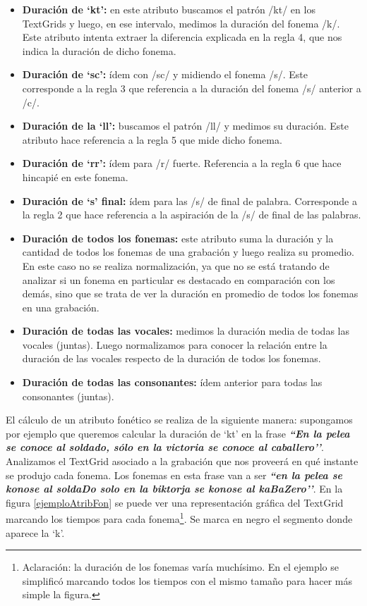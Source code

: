 \begin{itemize}
    \item \textbf{Duración de `kt’:} en este atributo buscamos el patrón /kt/ en los TextGrids y luego, en ese intervalo, medimos la duración del fonema /k/. Este atributo intenta extraer la diferencia explicada en la regla 4, que nos indica la duración de dicho fonema.
    \item \textbf{Duración de `sc’:} ídem con /sc/ y midiendo el fonema /s/. Este corresponde a la regla 3 que referencia a la duración del fonema /s/ anterior a /c/.  
    \item \textbf{Duración de la `ll’:} buscamos el patrón /ll/ y medimos su duración. Este atributo hace referencia a la regla 5 que mide dicho fonema.
    \item \textbf{Duración de `rr’:} ídem para /r/ fuerte. Referencia a la regla 6 que hace hincapié en este fonema.
    \item \textbf{Duración de `s’ final:} ídem para las /s/ de final de palabra. Corresponde a la regla 2 que hace referencia a la aspiración de la /s/ de final de las palabras.  
    \item \textbf{Duración de todos los fonemas:} este atributo suma la duración y la cantidad de todos los fonemas de una grabación y luego realiza su promedio. En este caso no se realiza normalización, ya que no se está tratando de analizar si un fonema en particular es destacado en comparación con los demás, sino que se trata de ver la duración en promedio de todos los fonemas en una grabación.
    \item \textbf{Duración de todas las vocales:} medimos la duración media de todas las vocales (juntas). Luego normalizamos para conocer la relación entre la duración de las vocales respecto de la duración de todos los fonemas.
    \item \textbf{Duración de todas las consonantes:} ídem anterior para todas las consonantes (juntas). 
\end{itemize}

El cálculo de un atributo fonético se realiza de la siguiente manera: supongamos por ejemplo que queremos calcular la duración de `kt’ en la frase \textbf{\textit{``En la pelea se conoce al soldado, sólo en la victoria se conoce al caballero’’}}. Analizamos el TextGrid asociado a la grabación que nos proveerá en qué instante se produjo cada fonema. Los fonemas en esta frase van a ser \textbf{\textit{``en la pelea se konose al soldaDo solo en la biktorja se konose al kaBaZero’’}}. En la figura \ref{ejemploAtribFon} se puede ver una representación gráfica del TextGrid marcando los tiempos para cada fonema\footnote{Aclaración: la duración de los fonemas varía muchísimo. En el ejemplo se simplificó marcando todos los tiempos con el mismo tamaño para hacer más simple la figura.}. Se marca en negro el segmento donde aparece la `k’.

